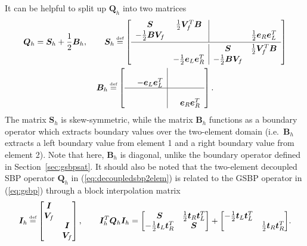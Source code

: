 \documentclass[review,onefignum,onetabnum,final]{siamart171218}
\newcommand{\LRs}[1]{\left[ #1 \right]}
\newcommand\myeq{\mathrel{\stackrel{\makebox[0pt]{\mbox{\normalfont\tiny def}}}{=}}}
\begin{document}
It can be helpful to split up $\bm{Q}_h$ into two matrices
\begin{gather*}
\bm{Q}_h = \bm{S}_h + \frac{1}{2}\bm{B}_h, \qquad
\bm{S}_h \myeq \LRs{\begin{array}{cc|cc}
\bm{S} &  \frac{1}{2}\bm{V}_f^T\bm{B} & & \\
 - \frac{1}{2}\bm{B}\bm{V}_f &  & & \frac{1}{2}\bm{e}_R\bm{e}_L^T\\ [.2em]
 \hline\\[-1.0em]
&& \bm{S} &  \frac{1}{2}\bm{V}_f^T\bm{B} \\
& -\frac{1}{2}\bm{e}_L\bm{e}_R^T &  - \frac{1}{2}\bm{B}\bm{V}_f &\\
\end{array}}\\
\bm{B}_h \myeq \LRs{\begin{array}{cc|cc}
&  & & \\
 & -\bm{e}_L\bm{e}_L^T & & \\
 \hline
&&  &  \\
&  && \bm{e}_R\bm{e}_R^T\\
\end{array}}.
\end{gather*}
The matrix $\bm{S}_h$ is skew-symmetric, while the matrix $\bm{B}_h$ functions as a boundary operator which extracts boundary values over the two-element domain (i.e.\ $\bm{B}_h$ extracts a left boundary value from element 1 and a right boundary value from element 2).  Note that here, $\bm{B}_h$ is diagonal, unlike the boundary operator defined in Section~\ref{sec:gsbpsat}.  It should also be noted that the two-element decoupled SBP operator $\bm{Q}_h$ in (\ref{eq:decoupledsbp2elem}) is related to the GSBP operator in (\ref{eq:gsbp}) through a block interpolation matrix
\[
\bm{I}_h \myeq \begin{bmatrix}
\bm{I} &\\
\bm{V}_f &\\
&\bm{I}\\
&\bm{V}_f\\
\end{bmatrix}, \qquad \bm{I}_h^T\bm{Q}_h\bm{I}_h = {\begin{bmatrix}
\bm{S}  & \frac{1}{2}\bm{t}_R\bm{t}_L^T \\
- \frac{1}{2}\bm{t}_L\bm{t}_R^T & \bm{S}
\end{bmatrix}}
+
{\begin{bmatrix}
-\frac{1}{2}\bm{t}_L\bm{t}_L^T  & \\
 & \frac{1}{2} \bm{t}_R\bm{t}_R^T
\end{bmatrix}}.
\]
\end{document}
